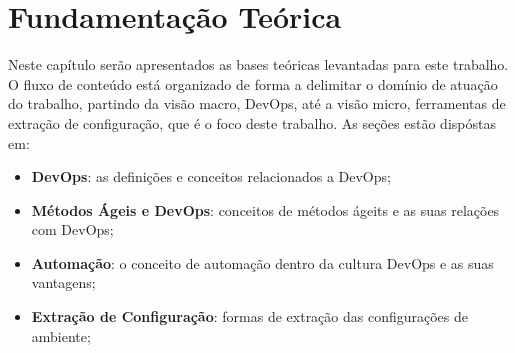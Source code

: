 \newpage\null\thispagestyle{empty}\newpage
\chapter{Fundamentação Teórica}
\label{chap:teoria}

Neste capítulo serão apresentados as bases teóricas levantadas para este trabalho.
O fluxo de conteúdo está organizado de forma a delimitar o domínio de atuação
do trabalho, partindo da visão macro, DevOps, até a visão micro, ferramentas de
extração de configuração, que é o foco deste trabalho. As seções estão dispóstas em:

\begin{itemize}
  \item \textbf{DevOps}: as definições e conceitos relacionados a DevOps;
  \item \textbf{Métodos Ágeis e DevOps}: conceitos de métodos ágeits e as suas relações com DevOps;
  \item \textbf{Automação}: o conceito de automação dentro da cultura DevOps e as suas vantagens;
  \item \textbf{Extração de Configuração}: formas de extração das configurações de ambiente;
\end{itemize}




